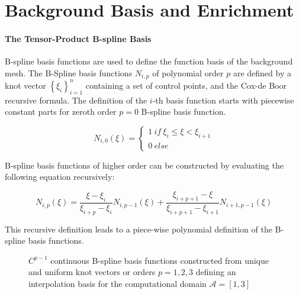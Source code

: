 \section{Background Basis and Enrichment}
\label{sec:overview_background}

\paragraph{The Tensor-Product B-spline Basis}
B-spline basis functions are used to define the function basis of the background mesh. 
The B-Spline basis functions $N_{i,p}$ of polynomial order $p$ are defined by a knot vector $\left\{\xi_i\right\}_{i = 1}^{n}$ containing a set of control points, and the Cox-de Boor recursive formula.  The definition of the $i$-th basis function starts with piecewise constant parts for zeroth order $p=0$ B-spline basis function.

\begin{equation} 
\label{eqn:BasisP0}
    N_{i,0}(\xi) = 
    \left\{
    \begin{array}{ll}1 \ if \ \xi_i \leq \xi < \xi_{i+1}\\  0\ else\end{array}
    \right.
\end{equation} 

B-spline basis functions of higher order can be constructed by evaluating the following equation recursively:
    
\begin{equation}
\label{eqn:CoxBoor}
    N_{i,p}(\xi) = 
    \frac{\xi - \xi_i}{\xi_{i+p} - \xi_i} N_{i,p-1}(\xi) + 
    \frac{\xi_{i+p+1} - \xi}{\xi_{i+p+1} - \xi_{i+1}} N_{i+1,p-1}(\xi)
\end{equation}

This recursive definition leads to a piece-wise polynomial definition of the  B-spline basis functions. 

\begin{figure}[H]
    \begin{center}
    \def\svgwidth{13.0cm}
    
    \caption{$C^{p-1}$ continuous B-spline basis functions constructed from unique and uniform knot vectors or orders $p = {1,2,3}$ defining an interpolation basis for the computational domain $\mathcal{A} = [1,3]$} 
    \label{fig:Bsp_basis}
    \end{center}
\end{figure}

